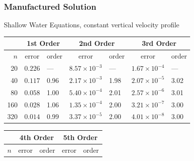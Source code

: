 \documentclass[10pt]{beamer}
\begin{document}
\begin{frame}
  \frametitle{Manufactured Solution}
  Shallow Water Equations, constant vertical velocity profile
  \footnotesize
  \begin{table}
    \centering
    \begin{tabular}{r*{6}l}
      \toprule
            & \multicolumn{2}{c}{1st Order} & \multicolumn{2}{c}{2nd Order} & \multicolumn{2}{c}{3rd Order}                                             \\
      \midrule
      \(n\) & \multicolumn{1}{c}{error}     & order                         & \multicolumn{1}{c}{error}     & order & \multicolumn{1}{c}{error} & order \\
      \midrule
      20    & \( 0.226 \)                   & ---                           & \( 8.57 \times 10^{-3} \)     & ---   & \( 1.67 \times 10^{-4} \) & ---   \\
      40    & \( 0.117 \)                   & 0.96                          & \( 2.17 \times 10^{-3} \)     & 1.98  & \( 2.07 \times 10^{-5} \) & 3.02  \\
      80    & \( 0.058 \)                   & 1.00                          & \( 5.40 \times 10^{-4} \)     & 2.01  & \( 2.57 \times 10^{-6} \) & 3.01  \\
      160   & \( 0.028 \)                   & 1.06                          & \( 1.35 \times 10^{-4} \)     & 2.00  & \( 3.21 \times 10^{-7} \) & 3.00  \\
      320   & \( 0.014 \)                   & 0.99                          & \( 3.37 \times 10^{-5} \)     & 2.00  & \( 4.01 \times 10^{-8} \) & 3.00  \\
      \bottomrule
    \end{tabular}
  \end{table}
  \begin{table}
    \centering
    \begin{tabular}{r*{4}l}
      \toprule
            & \multicolumn{2}{c}{4th Order} & \multicolumn{2}{c}{5th Order}                                       \\
      \midrule
      \(n\) & \multicolumn{1}{c}{error}     & order                         & \multicolumn{1}{c}{error}   & order \\

\end{tabular}
\end{table}
\end{frame}
\end{document}
